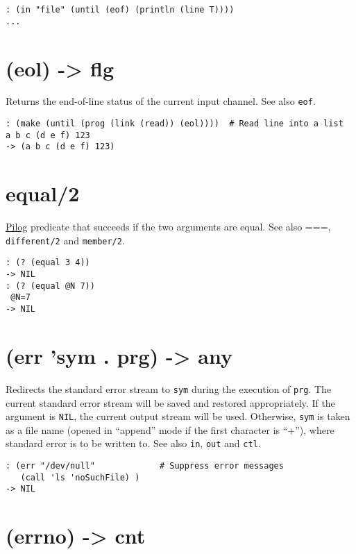 {{{{{\begin{verbatim}
: (in "file" (until (eof) (println (line T))))
...
\end{verbatim}

 
\section{(eol) -> flg}
\label{sec-8-1-5-9}


Returns the end-of-line status of the current input channel. See also
\texttt{eof}.


\begin{verbatim}
: (make (until (prog (link (read)) (eol))))  # Read line into a list
a b c (d e f) 123
-> (a b c (d e f) 123)
\end{verbatim}

 
\section{equal/2}
\label{sec-8-1-5-10}


\hyperref[ref.html-pilog]{Pilog} predicate that succeeds if the two arguments
are equal. See also ===, \texttt{different/2} and \texttt{member/2}.


\begin{verbatim}
: (? (equal 3 4))
-> NIL
: (? (equal @N 7))
 @N=7
-> NIL
\end{verbatim}

 
\section{(err 'sym . prg) -> any}
\label{sec-8-1-5-11}


Redirects the standard error stream to \texttt{sym} during the execution of
\texttt{prg}. The current standard error stream will be saved and restored
appropriately. If the argument is \texttt{NIL}, the current output stream will
be used. Otherwise, \texttt{sym} is taken as a file name (opened in ``append''
mode if the first character is ``+''), where standard error is to be
written to. See also \texttt{in}, \texttt{out} and \texttt{ctl}.


\begin{verbatim}
: (err "/dev/null"             # Suppress error messages
   (call 'ls 'noSuchFile) )
-> NIL
\end{verbatim}

 
\section{(errno) -> cnt}
\label{sec-8-1-5-12}


}}}}}

